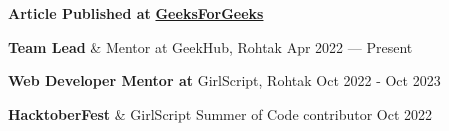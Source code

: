 \begin{zitemize} %
    \item \textbf{Article Published at} \href{https://www.geeksforgeeks.org/user/mehraankush/contributions/}{\textbf{GeeksForGeeks}} 
    \item \textbf{Team Lead} \& Mentor at GeekHub, Rohtak \hfill Apr 2022 --- Present
    \item \textbf{Web Developer Mentor at} GirlScript, Rohtak \hfill Oct 2022 - Oct 2023
    \item \textbf{HacktoberFest} \& GirlScript Summer of Code contributor \hfill Oct 2022
\end{zitemize}

